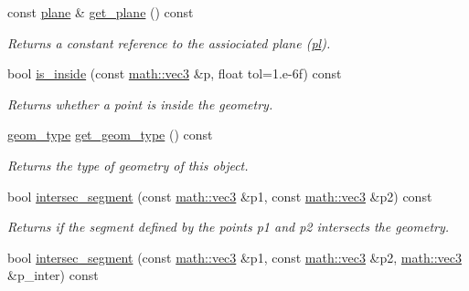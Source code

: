 \begin{DoxyCompactItemize}
\mbox{\label{classphysim_1_1geom_1_1triangle_a09fa39a12432490ecb1ed21934956178}} 
const \hyperlink{classphysim_1_1geom_1_1plane}{plane} \& \hyperlink{classphysim_1_1geom_1_1triangle_a09fa39a12432490ecb1ed21934956178}{get\+\_\+plane} () const
\begin{DoxyCompactList}\small\item\em Returns a constant reference to the assiociated plane (\hyperlink{classphysim_1_1geom_1_1triangle_a922a64002b6f20464754fdd1d1b7e382}{pl}). \end{DoxyCompactList}\item 
bool \hyperlink{classphysim_1_1geom_1_1triangle_a225a095a4ae50eb2f591d126cfefaf71}{is\+\_\+inside} (const \hyperlink{structphysim_1_1math_1_1vec3}{math\+::vec3} \&p, float tol=1.e-\/6f) const
\begin{DoxyCompactList}\small\item\em Returns whether a point is inside the geometry. \end{DoxyCompactList}\item 
\mbox{\label{classphysim_1_1geom_1_1triangle_a25420492ea77ad4080980e8a9486a769}} 
\hyperlink{namespacephysim_1_1geom_a473d69ab4667a730784b37b67fa4b658}{geom\+\_\+type} \hyperlink{classphysim_1_1geom_1_1triangle_a25420492ea77ad4080980e8a9486a769}{get\+\_\+geom\+\_\+type} () const
\begin{DoxyCompactList}\small\item\em Returns the type of geometry of this object. \end{DoxyCompactList}\item 
bool \hyperlink{classphysim_1_1geom_1_1triangle_af6e30fe8ae17486788f215be4065bbe9}{intersec\+\_\+segment} (const \hyperlink{structphysim_1_1math_1_1vec3}{math\+::vec3} \&p1, const \hyperlink{structphysim_1_1math_1_1vec3}{math\+::vec3} \&p2) const
\begin{DoxyCompactList}\small\item\em Returns if the segment defined by the points {\itshape p1} and {\itshape p2} intersects the geometry. \end{DoxyCompactList}\item 
bool \hyperlink{classphysim_1_1geom_1_1triangle_a0b3385fe699bddd1f4e57bfa917a567f}{intersec\+\_\+segment} (const \hyperlink{structphysim_1_1math_1_1vec3}{math\+::vec3} \&p1, const \hyperlink{structphysim_1_1math_1_1vec3}{math\+::vec3} \&p2, \hyperlink{structphysim_1_1math_1_1vec3}{math\+::vec3} \&p\+\_\+inter) const

\end{DoxyCompactItemize}
